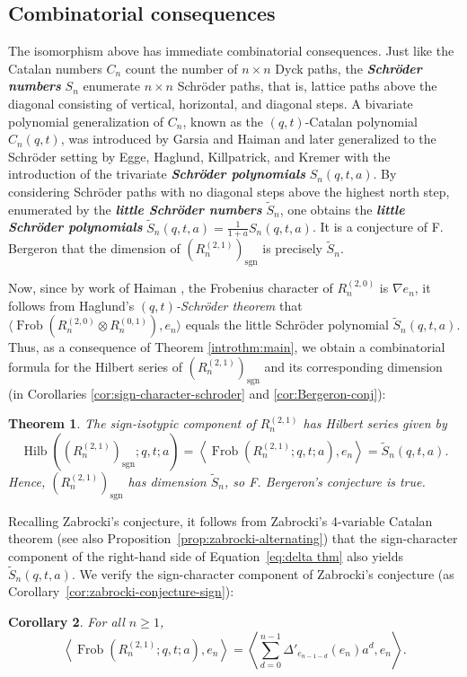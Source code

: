 \documentclass[11pt, noadjust, reqno]{amsart}
\newtheorem{introthm}{Theorem}
\newtheorem{introcor}[introthm]{Corollary}
\theoremstyle{definition}
\theoremstyle{remark}
\numberwithin{equation}{section}
\newcommand{\0}{\emptyset}
\DeclareMathOperator{\Hilb}{Hilb}
\DeclareMathOperator{\Frob}{Frob}
\DeclareMathOperator{\sgn}{sgn}
\newcommand{\newword}[1]{\emph{\textbf{#1}}}
\begin{document}
\subsection{Combinatorial consequences} The isomorphism above has immediate combinatorial consequences. Just like the Catalan numbers $C_n$ count the number of $n \times n$ Dyck paths, the \newword{Schr\"oder numbers} $S_n$ \cite{schroder} enumerate $n \times n$ Schr\"oder paths, that is, lattice paths above the diagonal consisting of vertical, horizontal, and diagonal steps. A bivariate polynomial generalization of $C_n$, known as the $(q,t)$-Catalan polynomial $C_n(q,t)$, was introduced by Garsia and Haiman \cite{Garsia-Haiman} and later generalized to the Schr\"oder setting by Egge, Haglund, Killpatrick, and Kremer \cite{EggeHaglundKillpatrickKremer} with the introduction of the trivariate \newword{Schr\"oder polynomials} $S_n(q,t,a)$.
By considering Schr\"oder paths with no diagonal steps above the highest north step, enumerated by the \newword{little Schr\"oder numbers} $\widetilde{S}_n$, one obtains the  
\newword{little Schr\"oder polynomials} $\widetilde{S}_n(q,t,a) = \frac{1}{1+a}S_n(q,t,a)$. It is a conjecture of F. Bergeron \cite{Bergeron2020} that the dimension of $(R_n^{(2,1)})_{\sgn}$ is precisely $\widetilde{S}_n$.

Now, since by work of Haiman \cite{Haiman2002}, the Frobenius character of $R_n^{(2,0)}$ is $\nabla e_n$, it follows from Haglund's \emph{$(q,t)$-Schr\"oder theorem} \cite{Haglund2004} that $\langle \Frob(R_n^{(2,0)} \otimes R_n^{(0,1)}), e_n \rangle$ equals the little Schr\"oder polynomial $\widetilde{S}_n(q,t,a)$. Thus, as a consequence of Theorem \ref{introthm:main}, we obtain a combinatorial formula for the Hilbert series of $(R_n^{(2,1)})_{\sgn}$ and its corresponding dimension (in Corollaries \ref{cor:sign-character-schroder} and \ref{cor:Bergeron-conj}):
\begin{introthm}\label{introthm:signcharacter}
    The sign-isotypic component of $R_n^{(2,1)}$ has Hilbert series given by
    \begin{equation*}
    \Hilb((R_n^{(2,1)})_{\sgn}; q,t;a
    )=\left\langle \Frob(R_n^{(2,1)};q,t;a), e_n\right\rangle = \widetilde{S}_n(q,t,a).
\end{equation*}
Hence, $(R_n^{(2,1)})_{\sgn}$ has dimension $\widetilde{S}_n$, so F. Bergeron's conjecture \cite{Bergeron2020} is true.
\end{introthm}

Recalling Zabrocki's conjecture, it follows from Zabrocki's 4-variable Catalan theorem \cite{Zabrocki-4Catalan-2016} (see also Proposition~\ref{prop:zabrocki-alternating}) that the sign-character component of the right-hand side of Equation~\eqref{eq:delta thm} also yields $\widetilde{S}_n(q,t,a)$. We verify the sign-character component of Zabrocki's conjecture (as Corollary~\ref{cor:zabrocki-conjecture-sign}):
\begin{introcor} 
  For all $n\geq 1$,
    \begin{equation*}
       \left\langle \Frob(R_n^{(2,1)};q,t;a),e_n \right\rangle = \left\langle \sum_{d=0}^{n-1} \Delta'_{e_{n-1-d}}(e_n) a^d, e_n \right\rangle.
    \end{equation*}
\end{introcor}
\end{document}
